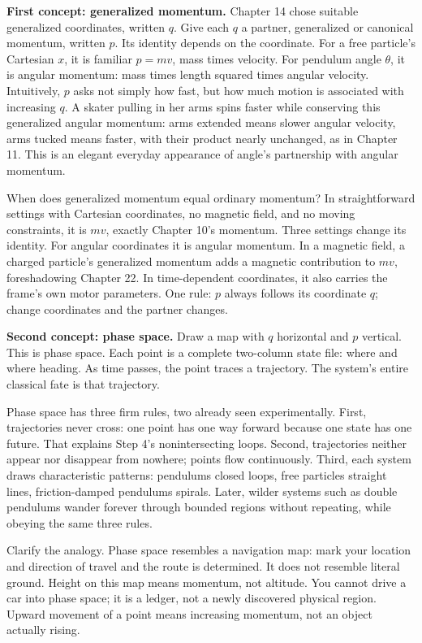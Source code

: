 \begin{mainline}
\textbf{First concept: generalized momentum.} Chapter 14 chose suitable generalized coordinates, written \(q\). Give each \(q\) a partner, generalized or canonical momentum, written \(p\). Its identity depends on the coordinate. For a free particle's Cartesian \(x\), it is familiar \(p=mv\), mass times velocity. For pendulum angle \(\theta\), it is angular momentum: mass times length squared times angular velocity. Intuitively, \(p\) asks not simply how fast, but how much motion is associated with increasing \(q\). A skater pulling in her arms spins faster while conserving this generalized angular momentum: arms extended means slower angular velocity, arms tucked means faster, with their product nearly unchanged, as in Chapter 11. This is an elegant everyday appearance of angle's partnership with angular momentum.

When does generalized momentum equal ordinary momentum? In straightforward settings with Cartesian coordinates, no magnetic field, and no moving constraints, it is \(mv\), exactly Chapter 10's momentum. Three settings change its identity. For angular coordinates it is angular momentum. In a magnetic field, a charged particle's generalized momentum adds a magnetic contribution to \(mv\), foreshadowing Chapter 22. In time-dependent coordinates, it also carries the frame's own motor parameters. One rule: \(p\) always follows its coordinate \(q\); change coordinates and the partner changes.

\textbf{Second concept: phase space.} Draw a map with \(q\) horizontal and \(p\) vertical. This is phase space. Each point is a complete two-column state file: where and where heading. As time passes, the point traces a trajectory. The system's entire classical fate is that trajectory.

Phase space has three firm rules, two already seen experimentally. First, trajectories never cross: one point has one way forward because one state has one future. That explains Step 4's nonintersecting loops. Second, trajectories neither appear nor disappear from nowhere; points flow continuously. Third, each system draws characteristic patterns: pendulums closed loops, free particles straight lines, friction-damped pendulums spirals. Later, wilder systems such as double pendulums wander forever through bounded regions without repeating, while obeying the same three rules.
\end{mainline}

Clarify the analogy. Phase space resembles a navigation map: mark your location and direction of travel and the route is determined. It does not resemble literal ground. Height on this map means momentum, not altitude. You cannot drive a car into phase space; it is a ledger, not a newly discovered physical region. Upward movement of a point means increasing momentum, not an object actually rising.

